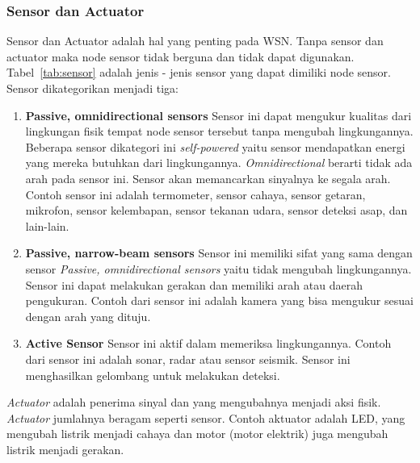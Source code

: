 \subsubsection{Sensor dan Actuator}
Sensor dan Actuator adalah hal yang penting pada WSN. Tanpa sensor dan actuator maka node sensor tidak berguna dan tidak dapat digunakan. Tabel~\ref{tab:sensor} adalah jenis - jenis sensor yang dapat dimiliki node sensor. Sensor dikategorikan menjadi tiga:
\begin{enumerate}
	\item \textbf{Passive, omnidirectional sensors} Sensor ini dapat mengukur kualitas dari lingkungan fisik tempat node sensor tersebut tanpa mengubah lingkungannya. Beberapa sensor dikategori ini \textit{self-powered} yaitu sensor mendapatkan energi yang mereka butuhkan dari lingkungannya. \textit{Omnidirectional} berarti tidak ada arah pada sensor ini. Sensor akan memancarkan sinyalnya ke segala arah. Contoh sensor ini adalah termometer, sensor cahaya, sensor getaran, mikrofon, sensor kelembapan, sensor tekanan udara, sensor deteksi asap, dan lain-lain.
	\item \textbf{Passive, narrow-beam sensors} Sensor ini memiliki sifat yang sama dengan sensor \textit{Passive, omnidirectional sensors} yaitu tidak mengubah lingkungannya. Sensor ini dapat melakukan gerakan dan memiliki arah atau daerah pengukuran. Contoh dari sensor ini adalah kamera yang bisa mengukur sesuai dengan arah yang dituju.
	\item \textbf{Active Sensor} Sensor ini aktif dalam memeriksa lingkungannya. Contoh dari sensor ini adalah sonar, radar atau sensor seismik. Sensor ini menghasilkan gelombang untuk melakukan deteksi.
\end{enumerate}

\textit{Actuator} adalah penerima sinyal dan yang mengubahnya menjadi aksi fisik. \textit{Actuator} jumlahnya beragam seperti sensor.  Contoh aktuator adalah LED, yang mengubah listrik menjadi cahaya dan motor (motor elektrik) juga mengubah listrik menjadi gerakan.

